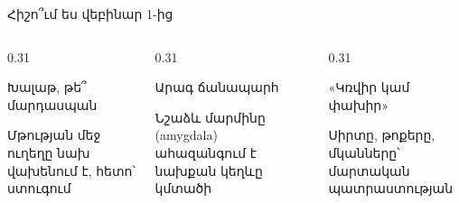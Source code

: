 
\begin{frame}{Հիշո՞ւմ ես վեբինար 1-ից}
  \begin{columns}[T]
    \begin{column}{0.31\textwidth}
      \begin{card}[colback=lavender!35!cardwhite]
        \par\smallskip
        {\blackfont Խալաթ, թե՞ մարդասպան}\par
        Մթության մեջ ուղեղը նախ վախենում է, հետո՝ ստուգում
      \end{card}
    \end{column}
    \begin{column}{0.31\textwidth}
      \begin{card}[colback=brainpink!30!cardwhite]
        \par\smallskip
        {\blackfont Արագ ճանապարհ}\par
        Նշաձև մարմինը (amygdala) ահազանգում է նախքան կեղևը կմտածի
      \end{card}
    \end{column}
    \begin{column}{0.31\textwidth}
      \begin{card}[colback=mint!35!cardwhite]
        \par\smallskip
        {\blackfont «Կռվիր կամ փախիր»}\par
        Սիրտը, թոքերը, մկանները՝ մարտական պատրաստության
      \end{card}
    \end{column}
  \end{columns}
  \vspace{3mm}
\end{frame}

